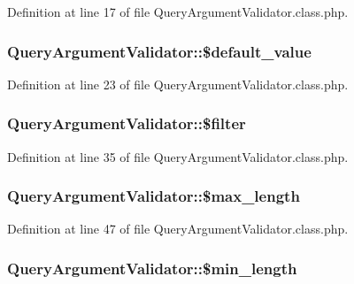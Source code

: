 Definition at line 17 of file Query\+Argument\+Validator.\+class.\+php.

\hypertarget{classQueryArgumentValidator_ae61c68b0a9cd40caa31c464ffddf4ffa}{
\subsubsection[{\$default\+\_\+value}]{\setlength{\rightskip}{0pt plus 5cm}Query\+Argument\+Validator\+::\$default\+\_\+value}}\label{classQueryArgumentValidator_ae61c68b0a9cd40caa31c464ffddf4ffa}


Definition at line 23 of file Query\+Argument\+Validator.\+class.\+php.

\hypertarget{classQueryArgumentValidator_a43b0653e37185f392daf500c50484186}{
\subsubsection[{\$filter}]{\setlength{\rightskip}{0pt plus 5cm}Query\+Argument\+Validator\+::\$filter}}\label{classQueryArgumentValidator_a43b0653e37185f392daf500c50484186}


Definition at line 35 of file Query\+Argument\+Validator.\+class.\+php.

\hypertarget{classQueryArgumentValidator_a6c99b1e774c49ebe4cbb5f8671156654}{
\subsubsection[{\$max\+\_\+length}]{\setlength{\rightskip}{0pt plus 5cm}Query\+Argument\+Validator\+::\$max\+\_\+length}}\label{classQueryArgumentValidator_a6c99b1e774c49ebe4cbb5f8671156654}


Definition at line 47 of file Query\+Argument\+Validator.\+class.\+php.

\hypertarget{classQueryArgumentValidator_a5553903c3bdf620408196db924a918c0}{
\subsubsection[{\$min\+\_\+length}]{\setlength{\rightskip}{0pt plus 5cm}Query\+Argument\+Validator\+::\$min\+\_\+length}}\label{classQueryArgumentValidator_a5553903c3bdf620408196db924a918c0}


